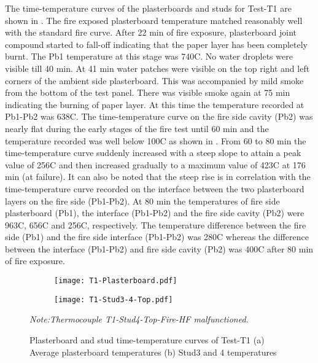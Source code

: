 The time-temperature curves of the plasterboards and studs for Test-T1 are shown in . The fire exposed plasterboard temperature matched reasonably well with the standard fire curve. After 22 min of fire exposure, plasterboard joint compound started to fall-off indicating that the paper layer has been completely burnt. The Pb1 temperature at this stage was 740\degree C. No water droplets were visible till 40 min. At 41 min water patches were visible on the top right and left corners of the ambient side plasterboard. This was accompanied by mild smoke from the bottom of the test panel. There was visible smoke again at 75 min indicating the burning of paper layer. At this time the temperature recorded at Pb1-Pb2 was 638\degree C. The time-temperature curve on the fire side cavity (Pb2) was nearly flat during the early stages of the fire test until 60 min and the temperature recorded was well below 100\degree C as shown in . From 60 to 80 min the time-temperature curve suddenly increased with a steep slope to attain a peak value of 256\degree C and then increased gradually to a maximum value of 423\degree C at 176 min (at failure). It can also be noted that the steep rise is in correlation with the time-temperature curve recorded on the interface between the two plasterboard layers on the fire side (Pb1-Pb2). At 80 min the temperatures of fire side plasterboard (Pb1), the interface (Pb1-Pb2) and the fire side cavity (Pb2) were 963\degree C, 656\degree C and 256\degree C, respectively. The temperature difference between the fire side (Pb1) and the fire side interface (Pb1-Pb2) was 280\degree C whereas the difference between the interface (Pb1-Pb2) and fire side cavity (Pb2) was 400\degree C after 80 min of fire exposure. 
\begin{figure}[!htbp]
	\centering
	\begin{subfigure}[b]{0.7\textwidth}
		\centering
		\texttt{[image: T1-Plasterboard.pdf]}
		\caption{}
		\label{subfig:T1-Plasterboard}
	\end{subfigure}
	\begin{subfigure}[b]{0.7\textwidth}
		\centering
		\texttt{[image: T1-Stud3-4-Top.pdf]}
		\caption{}
		\label{subfig:T1-Stud3-4-Top}
	\end{subfigure}
	   \caption{Plasterboard and stud time-temperature curves of Test-T1 (a) Average plasterboard temperatures (b) Stud3 and 4 temperatures}
	   \label{fig:T1-PB-Stud}
	   \fontsize{10}{1}\textit{Note:Thermocouple T1-Stud4-Top-Fire-HF malfunctioned.}
\end{figure}

